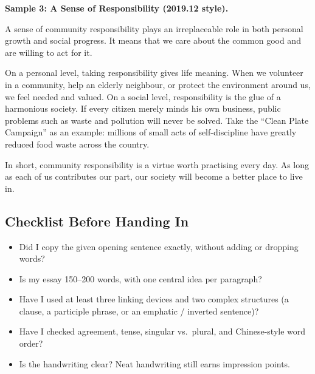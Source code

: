 \noindent\textbf{Sample 3: A Sense of Responsibility (2019.12 style).}
\par\medskip
\noindent A sense of community responsibility plays an irreplaceable role in both personal growth and social progress. It means that we care about the common good and are willing to act for it.
\par\smallskip
\noindent On a personal level, taking responsibility gives life meaning. When we volunteer in a community, help an elderly neighbour, or protect the environment around us, we feel needed and valued. On a social level, responsibility is the glue of a harmonious society. If every citizen merely minds his own business, public problems such as waste and pollution will never be solved. Take the ``Clean Plate Campaign'' as an example: millions of small acts of self-discipline have greatly reduced food waste across the country.
\par\smallskip
\noindent In short, community responsibility is a virtue worth practising every day. As long as each of us contributes our part, our society will become a better place to live in.
\par\medskip

\subsection{Checklist Before Handing In}

\begin{itemize}[leftmargin=1.4em]
  \item Did I copy the given opening sentence exactly, without adding or dropping words?
  \item Is my essay 150--200 words, with one central idea per paragraph?
  \item Have I used at least three linking devices and two complex structures (a clause, a participle phrase, or an emphatic / inverted sentence)?
  \item Have I checked agreement, tense, singular vs.\ plural, and Chinese-style word order?
  \item Is the handwriting clear? Neat handwriting still earns impression points.
\end{itemize}
